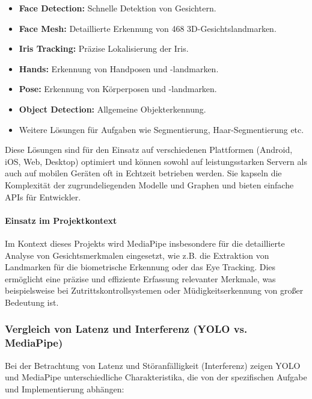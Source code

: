 \begin{itemize}
    \item \textbf{Face Detection:} Schnelle Detektion von Gesichtern.
    \item \textbf{Face Mesh:} Detaillierte Erkennung von 468 3D-Gesichtslandmarken.
    \item \textbf{Iris Tracking:} Präzise Lokalisierung der Iris.
    \item \textbf{Hands:} Erkennung von Handposen und -landmarken.
    \item \textbf{Pose:} Erkennung von Körperposen und -landmarken.
    \item \textbf{Object Detection:} Allgemeine Objekterkennung.
    \item Weitere Lösungen für Aufgaben wie Segmentierung, Haar-Segmentierung etc.
\end{itemize}

Diese Lösungen sind für den Einsatz auf verschiedenen Plattformen (Android, iOS, Web, Desktop) optimiert und können sowohl auf leistungsstarken Servern als auch auf mobilen Geräten oft in Echtzeit betrieben werden. Sie kapseln die Komplexität der zugrundeliegenden Modelle und Graphen und bieten einfache APIs für Entwickler.

\paragraph{Einsatz im Projektkontext}
Im Kontext dieses Projekts wird MediaPipe insbesondere für die detaillierte Analyse von Gesichtsmerkmalen eingesetzt, wie z.B. die Extraktion von Landmarken für die biometrische Erkennung oder das Eye Tracking. Dies ermöglicht eine präzise und effiziente Erfassung relevanter Merkmale, was beispielsweise bei Zutrittskontrollsystemen oder Müdigkeitserkennung von großer Bedeutung ist.

\subsubsection{Vergleich von Latenz und Interferenz (YOLO vs. MediaPipe)}
Bei der Betrachtung von Latenz und Störanfälligkeit (Interferenz) zeigen YOLO und MediaPipe unterschiedliche Charakteristika, die von der spezifischen Aufgabe und Implementierung abhängen:

